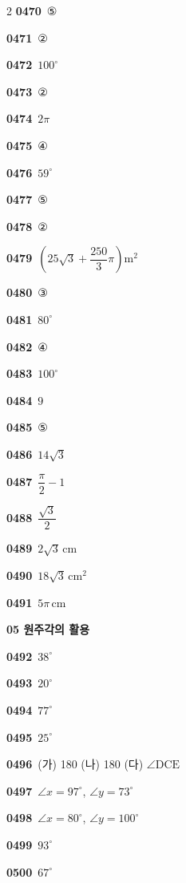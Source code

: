 \documentclass[10pt,a4paper]{article}
\newcommand{\pt}[1]{\mathrm{#1}}
\begin{document}
\begin{multicols}{2}
\noindent\textbf{0470}\ ⑤\par
\noindent\textbf{0471}\ ②\par
\noindent\textbf{0472}\ $100^\circ$\par
\noindent\textbf{0473}\ ②\par
\noindent\textbf{0474}\ $2\pi$\par
\noindent\textbf{0475}\ ④\par
\noindent\textbf{0476}\ $59^\circ$\par
\noindent\textbf{0477}\ ⑤\par
\noindent\textbf{0478}\ ②\par
\noindent\textbf{0479}\ $\left(25\sqrt{3}+\dfrac{250}{3}\pi\right)\mathrm{m}^2$\par
\noindent\textbf{0480}\ ③\par
\noindent\textbf{0481}\ $80^\circ$\par
\noindent\textbf{0482}\ ④\par
\noindent\textbf{0483}\ $100^\circ$\par
\noindent\textbf{0484}\ $9$\par
\noindent\textbf{0485}\ ⑤\par
\noindent\textbf{0486}\ $14\sqrt{3}$\par
\noindent\textbf{0487}\ $\dfrac{\pi}{2}-1$\par
\noindent\textbf{0488}\ $\dfrac{\sqrt{3}}{2}$\par
\noindent\textbf{0489}\ $2\sqrt{3}\,\mathrm{cm}$\par
\noindent\textbf{0490}\ $18\sqrt{3}\,\mathrm{cm}^2$\par
\noindent\textbf{0491}\ $5\pi\,\mathrm{cm}$\par
\noindent\textbf{05 원주각의 활용}\par\smallskip
\noindent\textbf{0492}\ $38^\circ$\par
\noindent\textbf{0493}\ $20^\circ$\par
\noindent\textbf{0494}\ $77^\circ$\par
\noindent\textbf{0495}\ $25^\circ$\par
\noindent\textbf{0496}\ (가) 180 (나) 180 (다) $\angle\pt{DCE}$\par
\noindent\textbf{0497}\ $\angle x=97^\circ$, $\angle y=73^\circ$\par
\noindent\textbf{0498}\ $\angle x=80^\circ$, $\angle y=100^\circ$\par
\noindent\textbf{0499}\ $93^\circ$\par
\noindent\textbf{0500}\ $67^\circ$\par

\end{multicols}
\end{document}
